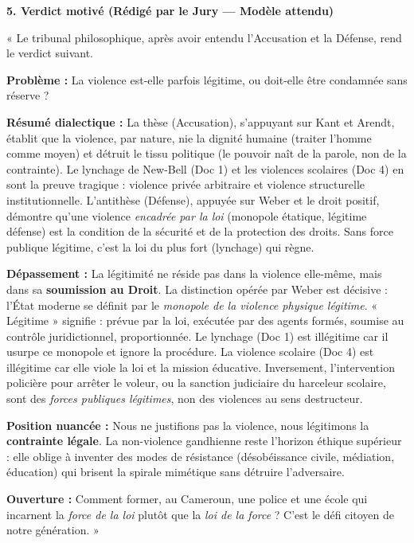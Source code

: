 \documentclass[11pt]{article}
\begin{document}
\begin{exoresolu}
\textbf{5. Verdict motivé (Rédigé par le Jury — Modèle attendu)}

« Le tribunal philosophique, après avoir entendu l'Accusation et la Défense, rend le verdict suivant.

\textbf{Problème :} La violence est-elle parfois légitime, ou doit-elle être condamnée sans réserve ?

\textbf{Résumé dialectique :} La thèse (Accusation), s'appuyant sur Kant et Arendt, établit que la violence, par nature, nie la dignité humaine (traiter l'homme comme moyen) et détruit le tissu politique (le pouvoir naît de la parole, non de la contrainte). Le lynchage de New-Bell (Doc 1) et les violences scolaires (Doc 4) en sont la preuve tragique : violence privée arbitraire et violence structurelle institutionnelle. L'antithèse (Défense), appuyée sur Weber et le droit positif, démontre qu'une violence \emph{encadrée par la loi} (monopole étatique, légitime défense) est la condition de la sécurité et de la protection des droits. Sans force publique légitime, c'est la loi du plus fort (lynchage) qui règne.

\textbf{Dépassement :} La légitimité ne réside pas dans la violence elle-même, mais dans sa \textbf{soumission au Droit}. La distinction opérée par Weber est décisive : l'État moderne se définit par le \emph{monopole de la violence physique légitime}. « Légitime » signifie : prévue par la loi, exécutée par des agents formés, soumise au contrôle juridictionnel, proportionnée. Le lynchage (Doc 1) est illégitime car il usurpe ce monopole et ignore la procédure. La violence scolaire (Doc 4) est illégitime car elle viole la loi et la mission éducative. Inversement, l'intervention policière pour arrêter le voleur, ou la sanction judiciaire du harceleur scolaire, sont des \emph{forces publiques légitimes}, non des violences au sens destructeur.

\textbf{Position nuancée :} Nous ne justifions pas la violence, nous légitimons la \textbf{contrainte légale}. La non-violence gandhienne reste l'horizon éthique supérieur : elle oblige à inventer des modes de résistance (désobéissance civile, médiation, éducation) qui brisent la spirale mimétique sans détruire l'adversaire.

\textbf{Ouverture :} Comment former, au Cameroun, une police et une école qui incarnent la \emph{force de la loi} plutôt que la \emph{loi de la force} ? C'est le défi citoyen de notre génération. »
\end{exoresolu}
\end{document}
